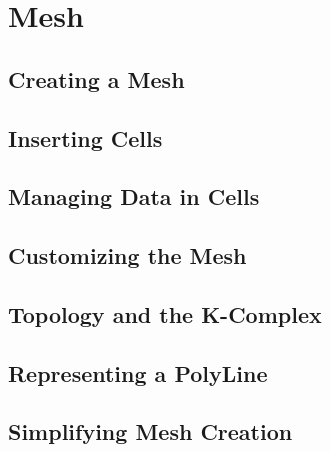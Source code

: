 


\section{Mesh}\label{MeshSection}

\subsection{Creating a Mesh}
\label{sec:CreatingAMesh}




\subsection{Inserting Cells}
\label{sec:InsertingCellsInMesh}




\subsection{Managing Data in Cells}
\label{sec:ManagingCellDataInMesh}




\subsection{Customizing the Mesh}
\label{sec:CustomizingTheMesh}




\subsection{Topology and the K-Complex}
\label{sec:MeshKComplex}




\subsection{Representing a PolyLine}
\label{sec:MeshPolyLine}




\subsection{Simplifying Mesh Creation}
\label{sec:AutomaticMesh}




